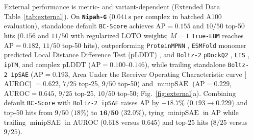 \documentclass[10pt,twocolumn]{article}
\begin{document}
External performance is metric- and variant-dependent (Extended Data Table~\ref{tab:external}). On \textbf{\texttt{Nipah-G}} ($0.041\,\text{s}$ per complex in batched A100 evaluation), standalone default \texttt{BC-Score} achieves $\text{AP} = 0.155$ and $10/50$ top-50 hits ($0.156$ and $11/50$ with regularized LOTO weights; $M=1$ \texttt{True-EBM} reaches $\text{AP} = 0.182$, $11/50$ top-50 hits), outperforming \texttt{ProteinMPNN} \cite{dauparas2022robust}, \texttt{ESMFold} monomer predicted Local Distance Difference Test (pLDDT) \cite{lin2023evolutionary}, and \texttt{Boltz-2} \texttt{pDockQ2} \cite{bryant2022pdockq,zhu2023pdockq2}, \texttt{LIS} \cite{kim2024lis}, \texttt{ipTM}, and complex pLDDT ($\text{AP} = 0.100\text{--}0.146$), while trailing standalone \texttt{Boltz-2 ipSAE} ($\text{AP} = 0.193$, Area Under the Receiver Operating Characteristic curve [$\text{AUROC}$] $= 0.622$, $7/25$ top-25, $9/50$ top-50) and $\min\text{ipSAE}$ ($\text{AP} = 0.229$, $\text{AUROC} = 0.645$, $9/25$ top-25, $10/50$ top-50; Fig.~\ref{fig:external}a). Combining default \texttt{BC-Score} with \texttt{Boltz-2 ipSAE} raises AP by $+18.7\%$ ($0.193 \to 0.229$) and top-50 hits from $9/50$ ($18\%$) to $\mathbf{16/50}$ ($32.0\%$), tying $\min\text{ipSAE}$ in AP while trailing $\min\text{ipSAE}$ in AUROC ($0.618$ versus $0.645$) and top-25 hits ($8/25$ versus $9/25$).
\end{document}
